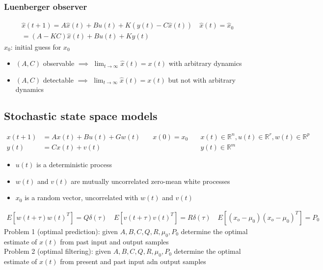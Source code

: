 \documentclass{book}
\newcommand{\R}{\mathbb{R}}
\theoremstyle{definition}
\theoremstyle{remark}
\theoremstyle{remark}
\begin{document}
\subsubsection{Luenberger observer}
\begin{gather*}
    \hat{x}(t+1)=A\hat{x}(t)+Bu(t)+K(y(t)-C\hat{x}(t)) \quad \hat{x}(t)=\hat{x}_0\\
    =(A-KC)\hat{x}(t)+Bu(t)+Ky(t)
\end{gather*}
$\hat{x}_0$: initial guess for $x_0$
\begin{itemize}
    \item $(A,C)$ observable $\implies$ $\lim_{t\to\infty}\hat{x}(t)=x(t)$ with arbitrary dynamics
    \item $(A,C)$ detectable $\implies$ $\lim_{t\to\infty}\hat{x}(t)=x(t)$ but not with arbitrary dynamics
\end{itemize}
\subsection{Stochastic state space models}
\begin{align*}
    x(t+1)&=Ax(t)+Bu(t)+Gw(t) \quad & x(0)=x_0 \quad & x(t)\in\R^n,u(t)\in\R^r,w(t)\in\R^p\\
    y(t) &= Cx(t) +v(t) & &y(t)\in\R^m
\end{align*}

\begin{itemize}
    \item $u(t)$ is a deterministic process 
    \item $w(t)$ and $v(t)$ are mutually uncorrelated zero-mean white processes 
    \item $x_0$ is a random vector, uncorrelated with $w(t)$ and $v(t)$
\end{itemize}
\begin{gather*}
    E[w(t+\tau)w(t)^T]=Q\delta(\tau) \quad E[v(t+\tau)v(t)^T]=R\delta(\tau) \quad E[(x_o-\mu_0)(x_o-\mu_0)^T]=P_0
\end{gather*}
Problem 1 (optimal prediction): given $A,B,C,Q,R,\mu_0,P_0$ determine the optimal estimate of $x(t)$ from past input and output samples\\
Problem 2 (optimal filtering): given $A,B,C,Q,R,\mu_0,P_0$ determine the optimal estimate of $x(t)$ from present and past input adn output samples
\end{document}
